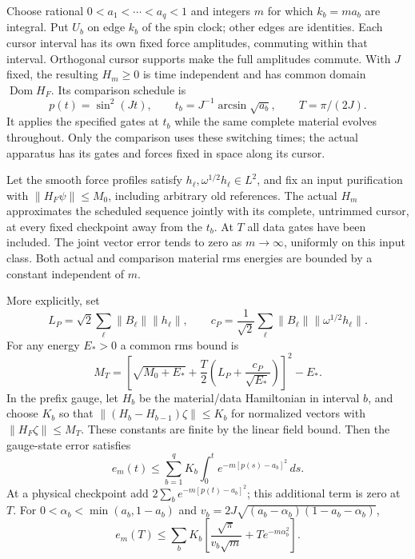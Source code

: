 Choose rational $0<a_1<\cdots<a_q<1$ and integers $m$ for which
$k_b=ma_b$ are integral. Put $U_b$ on edge $k_b$ of the spin clock;
other edges are identities. Each cursor interval has its own fixed
force amplitudes, commuting within that interval. Orthogonal cursor
supports make the full amplitudes commute. With $J$ fixed, the
resulting $H_m\ge0$ is time independent and has common domain
$\operatorname{Dom}H_F$. Its comparison schedule is
\[
 p(t)=\sin^2(Jt),\qquad t_b=J^{-1}\arcsin\sqrt{a_b},
 \qquad T=\pi/(2J).
\]
It applies the specified gates at $t_b$ while the same complete
material evolves throughout. Only the comparison uses these switching
times; the actual apparatus has its gates and forces fixed in space
along its cursor.

\begin{proposition}
\label{prop:one-path-rounds}
Let the smooth force profiles satisfy
$h_\ell,\omega^{1/2}h_\ell\in L^2$, and fix an input purification
with $\|H_F\psi\|\le M_0$, including arbitrary old references.
The actual $H_m$ approximates the scheduled sequence jointly with
its complete, untrimmed cursor, at every fixed checkpoint away from
the $t_b$. At $T$ all data gates have been included. The joint vector
error tends to zero as $m\to\infty$, uniformly on this input class.
Both actual and comparison material rms energies are bounded by a
constant independent of $m$.

More explicitly, set
\[
 L_P=\sqrt2\sum_\ell\|B_\ell\|\|h_\ell\|,
 \qquad c_P=\frac1{\sqrt2}\sum_\ell\|B_\ell\|
                                      \|\omega^{1/2}h_\ell\|.
\]
For any energy $E_*>0$ a common rms bound is
\begin{equation}
 M_T=\left[\sqrt{M_0+E_*}
       +\frac T2\left(L_P+\frac{c_P}{\sqrt{E_*}}\right)\right]^2-E_*.
 \label{eq:path-material-moment}
\end{equation}
In the prefix gauge, let $H_b$ be the material/data Hamiltonian
in interval $b$, and choose $K_b$ so that
$\|(H_b-H_{b-1})\zeta\|\le K_b$ for normalized vectors with
$\|H_F\zeta\|\le M_T$. These constants are finite by the linear
field bound. Then the gauge-state error satisfies
\begin{equation}
 e_m(t)\le\sum_{b=1}^q K_b\int_0^t
                  e^{-m[p(s)-a_b]^2}\,ds.
 \label{eq:path-duhamel}
\end{equation}
At a physical checkpoint add
$2\sum_b e^{-m[p(t)-a_b]^2}$; this additional term is zero at $T$.
For $0<\alpha_b<\min(a_b,1-a_b)$ and
$v_b=2J\sqrt{(a_b-\alpha_b)(1-a_b-\alpha_b)}$,
\begin{equation}
 e_m(T)\le\sum_bK_b
 \left[\frac{\sqrt\pi}{v_b\sqrt m}+T e^{-m\alpha_b^2}\right].
 \label{eq:path-terminal}
\end{equation}
\end{proposition}
